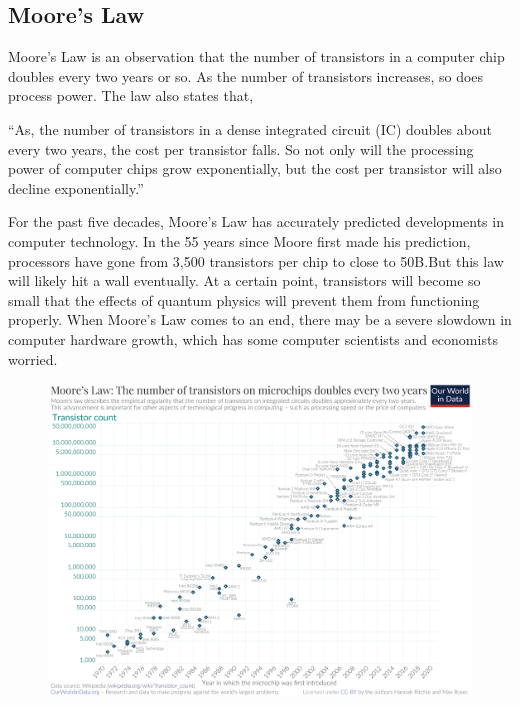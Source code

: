 \documentclass{article}
\begin{document}
\newpage
\subsection{Moore's Law}
\label{subsec:Moore's Law}
Moore’s Law is an observation that the number of transistors in a computer chip doubles every two years or so. As the number of transistors increases, so does process power. The law also states that, 
\begin{displayquote}
“As, the number of transistors in a dense integrated circuit (IC) doubles about every two years, the cost per transistor falls. So not only will the processing power of computer chips grow exponentially, but the cost per transistor will also decline exponentially.”    
\end{displayquote}
For the past five decades, Moore’s Law has accurately predicted developments in computer technology. In the 55 years since Moore first made his prediction, processors have gone from 3,500 transistors per chip to close to 50B.But this law will likely hit a wall eventually. At a certain point, transistors will become so small that the effects of quantum physics will prevent them from functioning properly. When Moore’s Law comes to an end, there may be a severe slowdown in computer hardware growth, which has some computer scientists and economists worried.
\begin{figure}[h]
    \centering
    \includegraphics[scale=0.12]{Moore's_Law_Transistor_Count_1970-2020.png}
\end{figure}
\newpage
\end{document}
